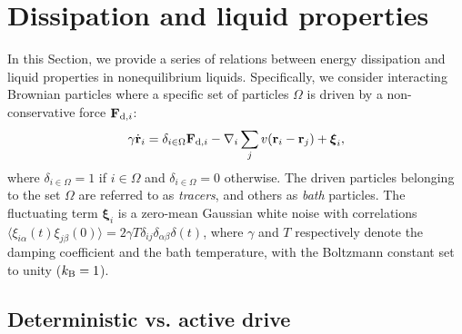 \documentclass[superscriptaddress, twocolumn, prx, longbibliography, nofootinbib]{revtex4-1}
\begin{document}


\section{Dissipation and liquid properties}\label{sec:method}

In this Section, we provide a series of relations between energy dissipation and liquid properties in nonequilibrium liquids. Specifically, we consider interacting Brownian particles where a specific set of particles $\Omega$ is driven by a non-conservative force ${\bf F}_{{\rm d},i}$:
\begin{equation}\label{eq:dyn}
	\gamma\dot{\bf r}_i = \delta_{i\in\Omega}{\bf F}_{{\rm d},i} - \nabla_i \sum_j v({\bf r}_i-{\bf r}_j) + {\boldsymbol\xi}_i ,
\end{equation}
where $\delta_{i\in\Omega}=1$ if $i\in\Omega$ and $\delta_{i\in\Omega}=0$ otherwise. The driven particles belonging to the set $\Omega$ are referred to as {\it tracers}, and others as {\it bath} particles. The fluctuating term ${\boldsymbol\xi}_i$ is a zero-mean Gaussian white noise with correlations $\langle\xi_{i\alpha}(t)\xi_{j\beta}(0)\rangle=2\gamma T\delta_{ij}\delta_{\alpha\beta}\delta(t)$, where $\gamma$ and $T$ respectively denote the damping coefficient and the bath temperature, with the Boltzmann constant set to unity ($k_{\rm B}=1$). 




\subsection{Deterministic vs. active drive}\label{sec:map}
\end{document}
